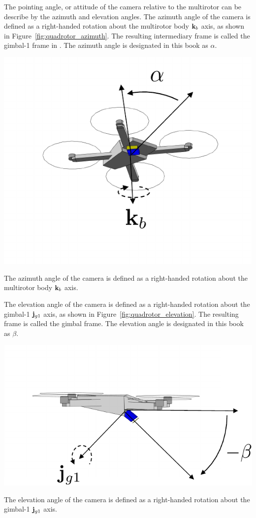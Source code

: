 The pointing angle, or attitude of the camera relative to the multirotor can be describe by the azimuth and elevation angles.  
%
The azimuth angle of the camera is defined as a right-handed rotation about the multirotor body $\mathbf{k}_b$ axis, as shown in Figure~\ref{fig:quadrotor_azimuth}.  The resulting intermediary frame is called the gimbal-1 frame in \cite{BeardMcLain12}.  The azimuth angle is designated in this book as $\alpha$.
\begin{marginfigure}
  \centering\includegraphics[width=\linewidth]{chap2_preliminaries/figures/quadrotor_azimuth}
  \caption{The azimuth angle of the camera is defined as a right-handed rotation about the multirotor body $\mathbf{k}_b$ axis.}
  \label{fig:quadrotor_azimuth}  
\end{marginfigure}
%
The elevation angle of the camera is defined as a right-handed rotation about the gimbal-1 $\mathbf{j}_{g1}$ axis, as shown in Figure~\ref{fig:quadrotor_elevation}.  The resulting frame is called the gimbal frame.  The elevation angle is designated in this book as $\beta$.
\begin{marginfigure}
  \centering\includegraphics[width=\linewidth]{chap2_preliminaries/figures/quadrotor_elevation}
  \caption{The elevation angle of the camera is defined as a right-handed rotation about the gimbal-1 $\mathbf{j}_{g1}$ axis.}
  \label{fig:quadrotor_elevation}  
\end{marginfigure}


